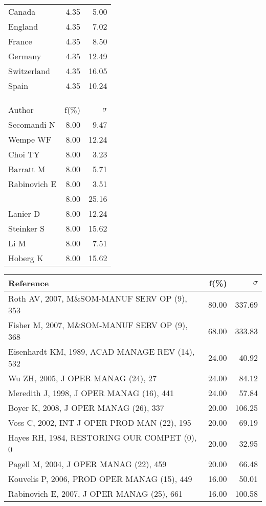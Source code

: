 \documentclass[a4paper,11pt]{report}
\begin{document}
\begin{landscape}
\begin{table}[!ht]
{\begin{tabular}{|l r r|}
Canada & 4.35 & 5.00\\
England & 4.35 & 7.02\\
France & 4.35 & 8.50\\
Germany & 4.35 & 12.49\\
Switzerland & 4.35 & 16.05\\
Spain & 4.35 & 10.24\\
 &  & \\
 &  & \\
 &  & \\
\hline
\hline
Author & f(\%) & $\sigma$\\
\hline
Secomandi N & 8.00 & 9.47\\
Wempe WF & 8.00 & 12.24\\
Choi TY & 8.00 & 3.23\\
Barratt M & 8.00 & 5.71\\
Rabinovich E & 8.00 & 3.51\\
[anonymous] & 8.00 & 25.16\\
Lanier D & 8.00 & 12.24\\
Steinker S & 8.00 & 15.62\\
Li M & 8.00 & 7.51\\
Hoberg K & 8.00 & 15.62\\
\hline
\end{tabular}
}
{\scriptsize\begin{tabular}{|l r r|}
\hline
Reference & f(\%) & $\sigma$\\
\hline
Roth AV, 2007, M\&SOM-MANUF SERV OP (9), 353 & 80.00 & 337.69\\
Fisher M, 2007, M\&SOM-MANUF SERV OP (9), 368 & 68.00 & 333.83\\
Eisenhardt KM, 1989, ACAD MANAGE REV (14), 532 & 24.00 & 40.92\\
Wu ZH, 2005, J OPER MANAG (24), 27 & 24.00 & 84.12\\
Meredith J, 1998, J OPER MANAG (16), 441 & 24.00 & 57.84\\
Boyer K, 2008, J OPER MANAG (26), 337 & 20.00 & 106.25\\
Voss C, 2002, INT J OPER PROD MAN (22), 195 & 20.00 & 69.19\\
Hayes RH, 1984, RESTORING OUR COMPET (0), 0 & 20.00 & 32.95\\
Pagell M, 2004, J OPER MANAG (22), 459 & 20.00 & 66.48\\
Kouvelis P, 2006, PROD OPER MANAG (15), 449 & 16.00 & 50.01\\
Rabinovich E, 2007, J OPER MANAG (25), 661 & 16.00 & 100.58\\

\end{tabular}}
\end{table}
\end{landscape}
\end{document}
